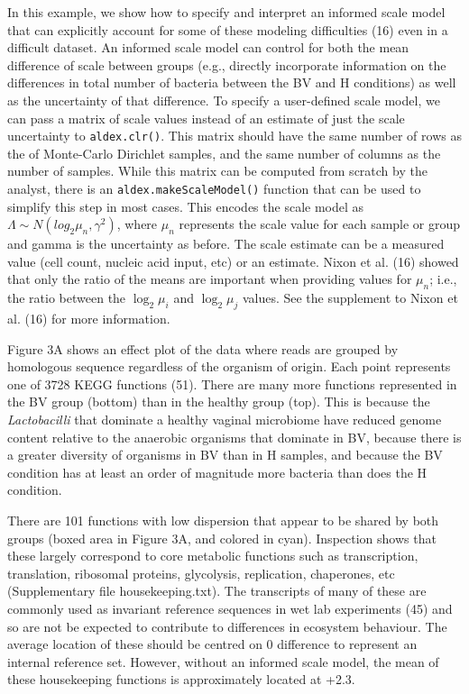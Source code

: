 \documentclass[
]{article}
\begin{document}
In this example, we show how to specify and interpret an informed scale
model that can explicitly account for some of these modeling
difficulties (16) even in a difficult dataset. An informed scale model
can control for both the mean difference of scale between groups (e.g.,
directly incorporate information on the differences in total number of
bacteria between the BV and H conditions) as well as the uncertainty of
that difference. To specify a user-defined scale model, we can pass a
matrix of scale values instead of an estimate of just the scale
uncertainty to \texttt{aldex.clr()}. This matrix should have the same
number of rows as the of Monte-Carlo Dirichlet samples, and the same
number of columns as the number of samples. While this matrix can be
computed from scratch by the analyst, there is an
\texttt{aldex.makeScaleModel()} function that can be used to simplify
this step in most cases. This encodes the scale model as
\(\Lambda \sim N(log_2 \mu_n, \gamma^{2})\), where \(\mu_n\) represents
the scale value for each sample or group and gamma is the uncertainty as
before. The scale estimate can be a measured value (cell count, nucleic
acid input, etc) or an estimate. Nixon et al. (16) showed that only the
ratio of the means are important when providing values for \(\mu_n\);
i.e., the ratio between the \(\log_2 \mu_i\) and \(\log_2 \mu_j\)
values. See the supplement to Nixon et al. (16) for more information.

Figure 3A shows an effect plot of the data where reads are grouped by
homologous sequence regardless of the organism of origin. Each point
represents one of 3728 KEGG functions (51). There are many more
functions represented in the BV group (bottom) than in the healthy group
(top). This is because the \textit{Lactobacilli} that dominate a healthy
vaginal microbiome have reduced genome content relative to the anaerobic
organisms that dominate in BV, because there is a greater diversity of
organisms in BV than in H samples, and because the BV condition has at
least an order of magnitude more bacteria than does the H condition.

There are 101 functions with low dispersion that appear to be shared by
both groups (boxed area in Figure 3A, and colored in cyan). Inspection
shows that these largely correspond to core metabolic functions such as
transcription, translation, ribosomal proteins, glycolysis, replication,
chaperones, etc (Supplementary file housekeeping.txt). The transcripts
of many of these are commonly used as invariant reference sequences in
wet lab experiments (45) and so are not be expected to contribute to
differences in ecosystem behaviour. The average location of these should
be centred on 0 difference to represent an internal reference set.
However, without an informed scale model, the mean of these housekeeping
functions is approximately located at +2.3.
\end{document}
